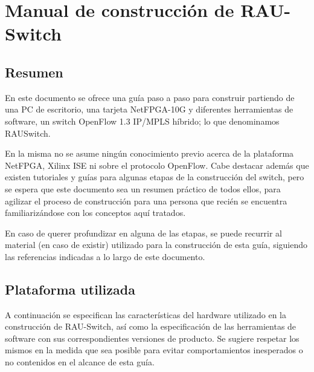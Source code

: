 
\chapter{Manual de construcción de RAU-Switch}

\ifpdf
    \graphicspath{{Anexo1/Figs/Raster/}{Anexo1/Figs/PDF/}{Anexo1/Figs/}}
\else
    \graphicspath{{Anexo1/Figs/Vector/}{Anexo1/Figs/}}
\fi



\section{Resumen}

En este documento se ofrece una guía paso a paso para construir partiendo de una PC de escritorio, una tarjeta NetFPGA-10G y diferentes herramientas de software, un switch OpenFlow 1.3 IP/MPLS híbrido; lo que denominamos RAUSwitch.

En la misma no se asume ningún conocimiento previo acerca de la plataforma NetFPGA, Xilinx ISE ni sobre el protocolo OpenFlow. Cabe destacar adem\'as que existen tutoriales y guías para algunas etapas de la construcción del switch, pero se espera que este documento sea un resumen práctico de todos ellos, para agilizar el proceso de construcción para una persona que recién se encuentra familiarizándose con los conceptos aquí tratados.

En caso de querer profundizar en alguna de las etapas, se puede recurrir al material (en caso de existir) utilizado para la construcci\'on de esta gu\'ia, siguiendo las referencias indicadas a lo largo de este documento.


\section{Plataforma utilizada}
\label{annexI.1}
A continuación se especifican las caracter\'isticas del hardware utilizado en la construcci\'on de RAU-Switch, as\'i como la especificaci\'on de las herramientas de software con sus correspondientes versiones de producto. Se sugiere respetar los mismos en la medida que sea posible para evitar comportamientos inesperados o no contenidos en el alcance de esta guía.

